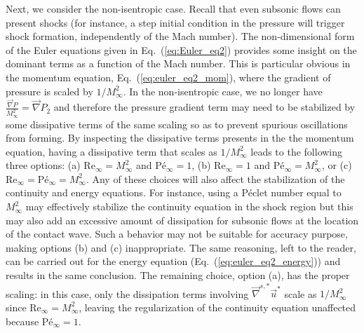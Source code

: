 \documentclass[preprint,10pt]{elsarticle}
\newcommand{\grad}{\vec{\nabla}}
\newcommand{\gradd}[1]{\vec{\nabla}^{#1}}
\renewcommand{\Re}{\textrm{Re}}
\newcommand{\Pe}{\textrm{P\'e}}
\renewcommand{\Pr}{\textrm{Pr}}
\newcommand{\eqt}[1]{Eq.~(\ref{#1})}                     %
\begin{document}
Next, we consider the non-isentropic case. Recall that even subsonic flows can present shocks (for instance, 
a step initial condition in the pressure will trigger shock formation, independently of the Mach number). 
The non-dimensional form of the Euler equations given in \eqt{eq:Euler_eq2} provides some insight on the 
dominant terms as a function of the Mach number. This is particular obvious in the momentum equation, \eqt{eq:euler_eq2_mom}, 
where the gradient of pressure is scaled by $1/M_\infty^2$. In the non-isentropic case, we no longer 
have $\frac{\grad P}{M_\infty^2}=\grad P_2$ and therefore the pressure gradient term may need to be stabilized by 
some dissipative terms of the same scaling so as to prevent spurious oscillations from forming. 
By inspecting the dissipative terms presents in the the momentum equation, having a dissipative term that 
scales as $1/M_\infty^2$ leads to the following three options: 
(a) $\Re_\infty = M_\infty^2$ and $\Pe_\infty = 1$,
(b) $\Re_\infty = 1$ and $\Pe_\infty = M_\infty^2$, or
(c) $\Re_\infty = \Pe_\infty = M_\infty^2$. 
%
Any of these choices will also affect the stabilization of the continuity and energy equations. 
For instance, using a P\'eclet number equal to $M_\infty^2$ may effectively stabilize the continuity 
equation in the shock region but this may also add an excessive amount of dissipation for subsonic 
flows at the location of the contact wave. Such a behavior may not be suitable for accuracy purpose, 
making options (b) and (c) inappropriate. The same reasoning, left to the reader, can be carried out 
for the energy equation (\eqt{eq:euler_eq2_energy}) and results in the same conclusion. The remaining 
choice, option (a), has the proper scaling: in this case, only the dissipation terms involving 
$\gradd{s,*} \vec{u}^*$ scale as $1/M_\infty^2$ since $\Re_\infty = M_\infty^2$, leaving the 
regularization of the continuity equation unaffected because $\Pe_\infty = 1$.
%
%
\end{document}
